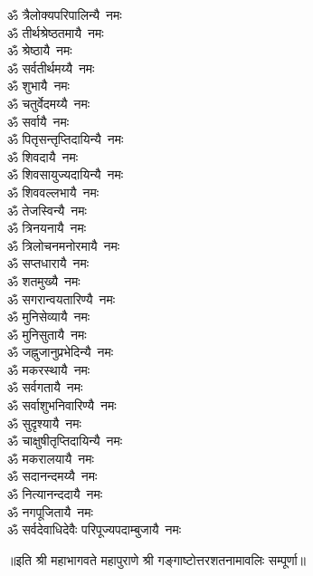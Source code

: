 \begin{multicols}{2}
\begin{flushleft}
ॐ त्रैलोक्यपरिपालिन्यै~नमः\\
ॐ तीर्थश्रेष्ठतमायै~नमः\hfill{}\\
ॐ श्रेष्ठायै~नमः\\
ॐ सर्वतीर्थमय्यै~नमः\\
ॐ शुभायै~नमः\\
ॐ चतुर्वेदमय्यै~नमः\\
ॐ सर्वायै~नमः\\
ॐ पितृसन्तृप्तिदायिन्यै~नमः\\
ॐ शिवदायै~नमः\\
ॐ शिवसायुज्यदायिन्यै~नमः\\
ॐ शिववल्लभायै~नमः\\
ॐ तेजस्विन्यै~नमः\hfill{}\\
ॐ त्रिनयनायै~नमः\\
ॐ त्रिलोचनमनोरमायै~नमः\\
ॐ सप्तधारायै~नमः\\
ॐ शतमुख्यै~नमः\\
ॐ सगरान्वयतारिण्यै~नमः\\
ॐ मुनिसेव्यायै~नमः\\
ॐ मुनिसुतायै~नमः\\
ॐ जह्नुजानुप्रभेदिन्यै~नमः\\
ॐ मकरस्थायै~नमः\\
ॐ सर्वगतायै~नमः\hfill{}\\
ॐ सर्वाशुभनिवारिण्यै~नमः\\
ॐ सुदृश्यायै~नमः\\
ॐ चाक्षुषीतृप्तिदायिन्यै~नमः\\
ॐ मकरालयायै~नमः\\
ॐ सदानन्दमय्यै~नमः\\
ॐ नित्यानन्ददायै~नमः\\
ॐ नगपूजितायै~नमः\\
ॐ सर्वदेवाधिदेवैः परिपूज्यपदाम्बुजायै~नमः\\
\end{flushleft}
\end{multicols}
॥इति श्री महाभागवते महापुराणे श्री गङ्गाष्टोत्तरशतनामावलिः सम्पूर्णा॥
